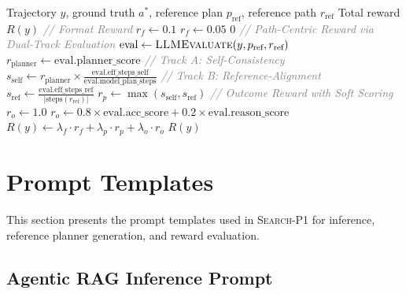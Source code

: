 \documentclass[11pt]{article}
\newcommand{\method}{\textsc{Search-P1}\xspace}
\begin{document}
\begin{algorithm*}[t]
\caption{\method Reward Computation}
\label{alg:reward}
\begin{algorithmic}[1]
\REQUIRE Trajectory $y$, ground truth $a^*$, reference plan $p_{\text{ref}}$, reference path $r_{\text{ref}}$
\ENSURE Total reward $R(y)$
\STATE \textcolor{gray}{\textit{// Format Reward}}
    \STATE $r_f \gets 0.1$
    \STATE $r_f \gets 0.05$
\ELSE
    \RETURN $0$ 
\ENDIF
\STATE
\STATE \textcolor{gray}{\textit{// Path-Centric Reward via Dual-Track Evaluation}}
\STATE $\text{eval} \gets \textsc{LLMEvaluate}(y, p_{\text{ref}}, r_{\text{ref}})$ 
\STATE $r_{\text{planner}} \gets \text{eval}.\text{planner\_score}$ 
\STATE
\STATE \textcolor{gray}{\textit{// Track A: Self-Consistency}}
\STATE $s_{\text{self}} \gets r_{\text{planner}} \times \frac{\text{eval}.\text{eff\_steps\_self}}{\text{eval}.\text{model\_plan\_steps}}$
\STATE
\STATE \textcolor{gray}{\textit{// Track B: Reference-Alignment}}
\STATE $s_{\text{ref}} \gets \frac{\text{eval}.\text{eff\_steps\_ref}}{|\text{steps}(r_{\text{ref}})|}$
\STATE
\STATE $r_p \gets \max(s_{\text{self}}, s_{\text{ref}})$ 
\STATE
\STATE \textcolor{gray}{\textit{// Outcome Reward with Soft Scoring}}
    \STATE $r_o \gets 1.0$
\ELSE
    \STATE $r_o \gets 0.8 \times \text{eval}.\text{acc\_score} + 0.2 \times \text{eval}.\text{reason\_score}$
\ENDIF
\STATE
\STATE $R(y) \gets \lambda_f \cdot r_f + \lambda_p \cdot r_p + \lambda_o \cdot r_o$
\RETURN $R(y)$
\end{algorithmic}
\end{algorithm*}

\section{Prompt Templates}
\label{sec:appendix_prompts}

This section presents the prompt templates used in \method for inference, reference planner generation, and reward evaluation.

\subsection{Agentic RAG Inference Prompt}
\end{document}
